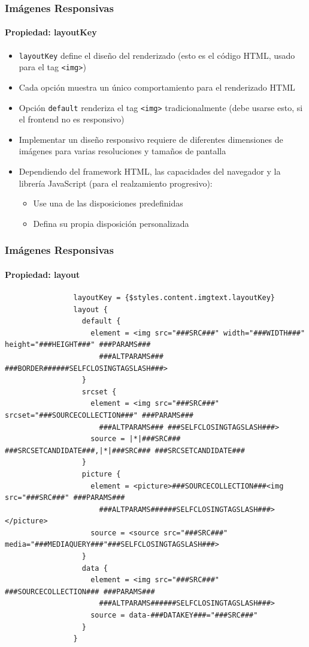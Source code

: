 \begin{frame}[fragile]
	\frametitle{Imágenes Responsivas}
	\framesubtitle{Propiedad: layoutKey}

	\begin{itemize}
		\item \texttt{layoutKey} define el diseño del renderizado\newline
			(esto es el código HTML, usado para el tag \texttt{<img>})
		\item Cada opción muestra un único comportamiento para el renderizado HTML
		\item Opción \texttt{default} renderiza el tag \texttt{<img>} tradicionalmente\newline
			(debe usarse esto, si el frontend no es responsivo)
		\item Implementar un diseño responsivo requiere de diferentes dimensiones de imágenes para varias resoluciones y tamaños de pantalla
		\item Dependiendo del framework HTML, las capacidades del navegador y la librería JavaScript (para el realzamiento progresivo):

			\begin{itemize}
				\item Use una de las disposiciones predefinidas
				\item Defina su propia disposición personalizada
			\end{itemize}

	\end{itemize}

\end{frame}


\begin{frame}[fragile]
	\frametitle{Imágenes Responsivas}
	\framesubtitle{Propiedad: layout}

			\lstset{
				basicstyle=\tiny\ttfamily
			}

			\begin{lstlisting}
				layoutKey = {$styles.content.imgtext.layoutKey}
				layout {
				  default {
				    element = <img src="###SRC###" width="###WIDTH###" height="###HEIGHT###" ###PARAMS###
				      ###ALTPARAMS### ###BORDER######SELFCLOSINGTAGSLASH###>
				  }
				  srcset {
				    element = <img src="###SRC###" srcset="###SOURCECOLLECTION###" ###PARAMS###
				      ###ALTPARAMS### ###SELFCLOSINGTAGSLASH###>
				    source = |*|###SRC### ###SRCSETCANDIDATE###,|*|###SRC### ###SRCSETCANDIDATE###
				  }
				  picture {
				    element = <picture>###SOURCECOLLECTION###<img src="###SRC###" ###PARAMS###
				      ###ALTPARAMS######SELFCLOSINGTAGSLASH###></picture>
				    source = <source src="###SRC###" media="###MEDIAQUERY###"###SELFCLOSINGTAGSLASH###>
				  }
				  data {
				    element = <img src="###SRC###" ###SOURCECOLLECTION### ###PARAMS###
				      ###ALTPARAMS######SELFCLOSINGTAGSLASH###>
				    source = data-###DATAKEY###="###SRC###"
				  }
				}
			\end{lstlisting}

\end{frame}

